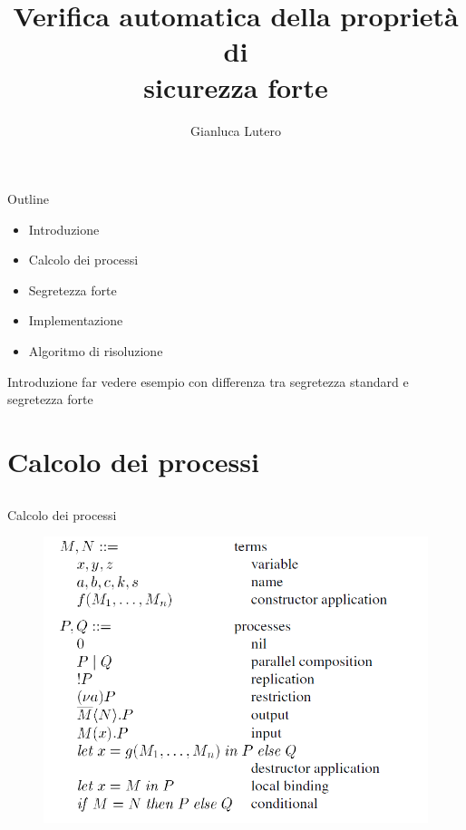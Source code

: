 \documentclass[11pt,xcolor=table]{beamer}
\title{Verifica automatica della proprietà di\\ sicurezza forte}
\author{Gianluca Lutero}
\institute{Alma Mater Studiorum Bologna\\Crittografia}
\date{}
\begin{document}
\begin{frame}{}
    \maketitle
\end{frame}

\begin{frame}{Outline}
    \begin{itemize}
        \item Introduzione
        \item Calcolo dei processi
        \item Segretezza forte
        \item Implementazione
        \item Algoritmo di risoluzione
    \end{itemize}
\end{frame}

\begin{frame}{Introduzione}
    far vedere esempio con differenza tra segretezza standard e segretezza forte
\end{frame}

\section{Calcolo dei processi}
\subsection{}
\begin{frame}{Calcolo dei processi}
    \begin{figure}[h]
        \centering
        \includegraphics[scale=0.5]{Relazione/Immagini/calcolo.PNG}
    \end{figure}
\end{frame}
\end{document}
